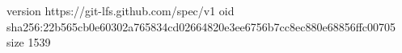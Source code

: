 version https://git-lfs.github.com/spec/v1
oid sha256:22b565cb0e60302a765834cd02664820e3ee6756b7cc8ec880e68856ffc00705
size 1539
